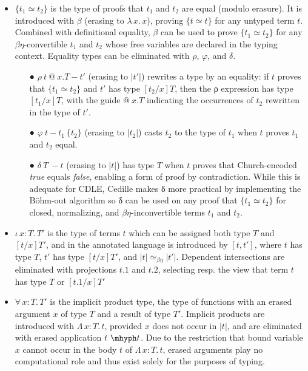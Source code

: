 \documentclass{article}
\newcommand{\abs}[4]{{#1}\, #2\! : \! #3.\, #4}
\newcommand{\absu}[3]{{#1}\, #2.\, #3}
\begin{document}
\begin{itemize}
\item $\{t_1 \simeq t_2\}$ is the type of proofs that $t_1$ and $t_2$ are equal
  (modulo erasure). It is introduced with $\beta$ (erasing to
  $\absu{\lambda}{x}{x}$), proving $\{t \simeq t\}$ for any untyped term $t$.
  Combined with definitional equality, $\beta$ can be used to prove $\{t_1 ≃
  t_2\}$ for any $\beta\eta$-convertible $t_1$ and $t_2$ whose
  free variables are declared in the typing context. Equality types can be
  eliminated with $\rho$, $\varphi$, and $\delta$.
  \begin{itemize}
  \item[●] $\rho\ t\ @\ x.T - t'$ (erasing to $|t'|$) rewrites a type
    by an equality: if $t$ proves that $\{t_1 \simeq t_2\}$ and $t'$ has type
    $[t_2/x]T$, then the ρ expression has type $[t_1/x]T$, with the guide $@\
    x.T$ indicating the occurrences of $t_2$ rewritten in the type of
    $t'$.
  \item[●] $\varphi\ t - t_1\ \{t_2\}$ (erasing to $|t_2|$) casts $t_2$ to the
    type of $t_1$  when $t$ proves $t_1$ and $t_2$ equal. 
  \item[●] $\delta\ T\ - t$ (erasing to $|t|$) has type $T$ when $t$ proves that
    Church-encoded \textit{true} equals \textit{false}, enabling a form of proof
    by contradiction. While this is adequate for CDLE, Cedille makes δ more
    practical by implementing the B{\"o}hm-out
    algorithm\cite{Bo68_Bohm-Out} so δ can be used on any proof that $\{t_1 ≃
    t_2\}$ for closed, normalizing, and $\beta\eta$-inconvertible terms $t_1$ and $t_2$.
  \end{itemize}
\item $\abs{\iota}{x}{T}{T'}$ is the type of terms $t$ which can be assigned
  both type $T$ and $[t/x]T'$, and in the annotated language is introduced by
$[t , t']$, where $t$ has type $T$, $t'$ has type $[t/x]T'$, and $|t|
\simeq_{\beta\eta} |t'|$. Dependent intersections are eliminated with
projections $t.1$ and $t.2$, selecting resp. the view that term $t$ has type $T$
or $[t.1/x]T'$
  
\item $\abs{\forall}{x}{T}{T'}$ is the implicit product type, the type of
  functions with an erased argument $x$ of type $T$ 
  and a result of type $T'$. Implicit products are introduced with
  $\abs{\Lambda}{x}{T}{t}$, provided $x$ does not occur in $|t|$, and are
  eliminated with erased application $t\ \mhyph t$. Due to the restriction that
  bound variable $x$ cannot occur in the body $t$ of $\abs{\Lambda}{x}{T}{t}$,
  erased arguments play no computational role and thus exist solely for the
  purposes of typing.
\end{itemize}
\end{document}
